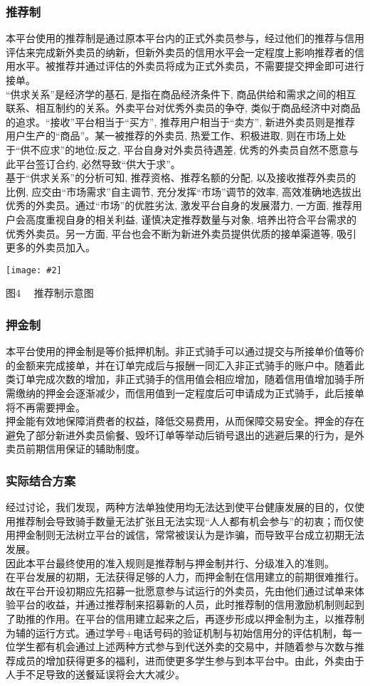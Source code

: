 \documentclass[UTF8]{ctexart}
\newcommand\picturehere[2][1]{\centerline{\texttt{[image: \#2]}}}
\newcommand\picfig[1]{\centerline{\small \heiti #1 \songti }}
\begin{document}
\begin{multicols}{2}
  \subsubsection{推荐制}
  \indent 本平台使用的推荐制是通过原本平台内的正式外卖员参与，经过他们的推荐与信用评估来完成新外卖员的纳新，但新外卖员的信用水平会一定程度上影响推荐者的信用水平。被推荐并通过评估的外卖员将成为正式外卖员，不需要提交押金即可进行接单。\\
  \indent “供求关系”是经济学的基石, 是指在商品经济条件下, 商品供给和需求之间的相互联系、相互制约的关系。外卖平台对优秀外卖员的争夺, 类似于商品经济中对商品的追求。“接收”平台相当于“买方”, 推荐用户相当于“卖方”, 新进外卖员则是推荐用户生产的“商品”。某一被推荐的外卖员, 热爱工作、积极进取, 则在市场上处于“供不应求”的地位;反之, 平台自身对外卖员待遇差, 优秀的外卖员自然不愿意与此平台签订合约, 必然导致“供大于求”。\\
  \indent 基于“供求关系”的分析可知, 推荐资格、推荐名额的分配, 以及接收推荐外卖员的比例, 应交由“市场需求”自主调节, 充分发挥“市场”调节的效率, 高效准确地选拔出优秀的外卖员。通过“市场”的优胜劣汰, 激发平台自身的发展潜力, 一方面, 推荐用户会高度重视自身的相关利益, 谨慎决定推荐数量与对象, 培养出符合平台需求的优秀外卖员。另一方面, 平台也会不断为新进外卖员提供优质的接单渠道等, 吸引更多的外卖员加入。
  \picturehere[0.4]{image/tree.png}
  \picfig{图4  \ \ 推荐制示意图}
  \subsubsection{押金制}
  \indent 本平台使用的押金制是等价抵押机制。非正式骑手可以通过提交与所接单价值等价的金额来完成接单，并在订单完成后与报酬一同汇入非正式骑手的账户中。随着此类订单完成次数的增加，非正式骑手的信用值会相应增加，随着信用值增加骑手所需缴纳的押金会逐渐减少，而信用值到一定程度后可申请成为正式骑手，此后接单将不再需要押金。\\
  \indent 押金能有效地保障消费者的权益，降低交易费用，从而保障交易安全。押金的存在避免了部分新进外卖员偷餐、毁坏订单等举动后销号退出的逃避后果的行为，是外卖员前期信用保证的辅助制度。
  \subsubsection{实际结合方案}
  经过讨论，我们发现，两种方法单独使用均无法达到使平台健康发展的目的，仅使用推荐制会导致骑手数量无法扩张且无法实现“人人都有机会参与”的初衷；而仅使用押金制则无法树立平台的诚信，常常被误认为是诈骗，而导致平台成立初期无法发展。\\
  \indent 因此本平台最终使用的准入规则是推荐制与押金制并行、分级准入的准则。\\
  \indent 在平台发展的初期，无法获得足够的人力，而押金制在信用建立的前期很难推行。故在平台开设初期应先招募一批愿意参与试运行的外卖员，先由他们通过试单来体验平台的收益，并通过推荐制来招募新的人员，此时推荐制的信用激励机制则起到了助推的作用。在平台的信用建立起来之后，再逐步形成以押金制为主，以推荐制为辅的运行方式。通过学号+电话号码的验证机制与初始信用分的评估机制，每一位学生都有机会通过上述两种方式参与到代送外卖的交易中，并随着参与次数与推荐成员的增加获得更多的福利，进而使更多学生参与到本平台中。由此，外卖由于人手不足导致的送餐延误将会大大减少。



\end{multicols}
\end{document}
